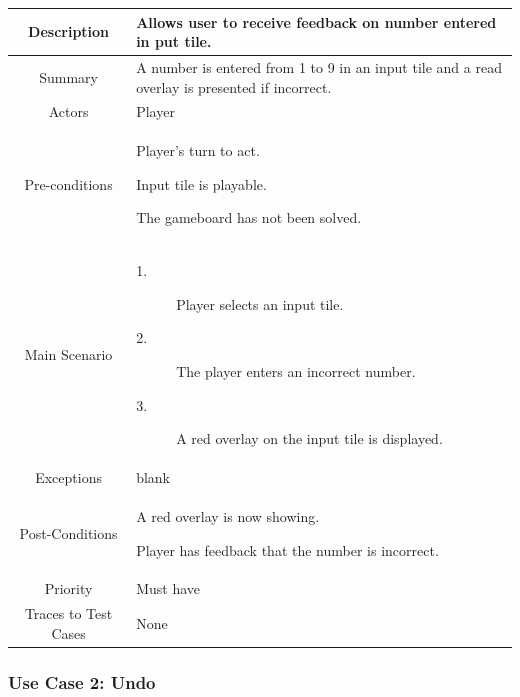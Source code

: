 \documentclass[12pt]{article}
\begin{document}
\begin{table}[htbp]
\begin{center}
\begin{tabular}{| c | m{10cm} |}
\hline
\cellcolor{lightgray}Description & Allows user to receive feedback on number entered in put tile. \\
\hline
\cellcolor{lightgray}Summary & A number is entered from 1 to 9 in an input tile and a read overlay is presented if incorrect. \\
\hline
\cellcolor{lightgray}Actors & Player \\
\hline
\cellcolor{lightgray}Pre-conditions &
\begin{description}[font=$\bullet$~\normalfont\scshape]
\item Player's turn to act.
\item Input tile is playable. 
\item The gameboard has not been solved.
\end{description}\\
\hline
\cellcolor{lightgray}Main Scenario & 
\begin{description}
\item [1.]Player selects an input tile.
\item [2.]The player enters an incorrect number. 
\item [3.]A red overlay on the input tile is displayed.
\end{description}\\
\hline
\cellcolor{lightgray}Exceptions & blank \\
\hline
\cellcolor{lightgray}Post-Conditions & 
\begin{description}[font=$\bullet$~\normalfont\scshape]
\item A red overlay is now showing.
\item Player has feedback that the number is incorrect.
\end{description}\\
\hline
\cellcolor{lightgray}Priority & Must have \\
\hline
\cellcolor{lightgray}Traces to Test Cases & None \\
\hline
\end{tabular}
\end{center}
\end{table}

\clearpage

\subsubsection{Use Case 2: Undo} \label{uc:2}
\end{document}
